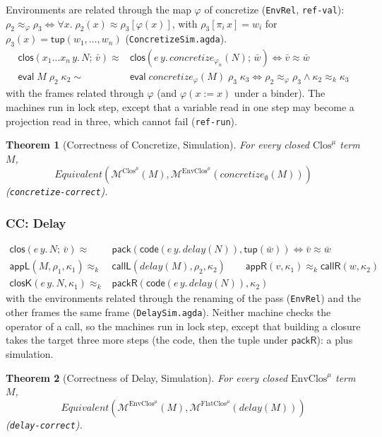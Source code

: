 \documentclass[10pt]{article}
\theoremstyle{acmplain}
\newtheorem{theorem}{Theorem}[section]
\newcommand{\key}[1]{\mathsf{#1}}
\newcommand{\pass}[1]{\mathit{#1}}
\newcommand{\prj}[1]{\pi_{#1}\,}
\newcommand{\ext}[3]{#1(#2{:=}#3)}
\newcommand{\ev}[3]{\key{eval}\;#1\;#2\;#3}
\newcommand{\Mach}[1]{\mathcal{M}^{#1}}
\newcommand{\Equiv}{\mathit{Equivalent}}
\newcommand{\closV}[2]{\key{clos}(#1;\, #2)}
\newcommand{\tupV}[1]{\key{tup}(#1)}
\newcommand{\Kf}[2]{\key{#1}(#2)}
\newcommand{\approxk}{\approx_k}
\newcommand{\Tpack}[2]{\key{pack}(#1, #2)}     %
\newcommand{\TcodeV}[1]{\key{code}(#1)}                   %
\newcommand{\Ml}[1]{\textrm{#1}^{\mu}}                  %
\begin{document}
Environments are related through the map $\varphi$ of concretize
(\texttt{EnvRel}, \texttt{ref-val}): $\rho_2 \approx_\varphi \rho_3 \iff
\forall x.\; \rho_2(x) \approx \rho_3[\varphi(x)]$, with
$\rho_3[\prj{i} x] = w_i$ for $\rho_3(x) = \tupV{w_1, \ldots, w_n}$
(\texttt{ConcretizeSim.agda}).
\begin{align*}
  \closV{x_1 \ldots x_n\, y.\, N}{\bar{v}} \approx {}&
    \closV{e\, y.\, \pass{concretize}_{\varphi_n}(N)}{\bar{w}}
    \iff \bar{v} \approx \bar{w} \\
  \ev{M}{\rho_2}{\kappa_2} \sim {}& \ev{\pass{concretize}_\varphi(M)}{\rho_3}{\kappa_3}
    \iff \rho_2 \approx_\varphi \rho_3 \land \kappa_2 \approxk \kappa_3
\end{align*}
with the frames related through $\varphi$ (and $\ext{\varphi}{x}{x}$ under a
binder). The machines run in lock step, except that a variable read in one
step may become a projection read in three, which cannot fail
(\texttt{ref-run}).
\begin{theorem}[Correctness of Concretize, Simulation]\label{thm:m-cek-concretize}
For every closed $\Ml{Clos}$ term $M$,
\[ \Equiv(\Mach{\Ml{Clos}}(M), \Mach{\Ml{EnvClos}}(\pass{concretize}_{\emptyset}(M))) \]
(\texttt{concretize-correct}).
\end{theorem}

\subsubsection{CC: Delay}

\begin{align*}
  \closV{e\, y.\, N}{\bar{v}} \approx {}&
    \Tpack{\TcodeV{e\, y.\, \pass{delay}(N)}}{\tupV{\bar{w}}} \iff \bar{v} \approx \bar{w} \\
  \Kf{appL}{M, \rho_1, \kappa_1} \approxk {}& \Kf{callL}{\pass{delay}(M), \rho_2, \kappa_2} \qquad
  \Kf{appR}{v, \kappa_1} \approxk \Kf{callR}{w, \kappa_2} \\
  \Kf{closK}{e\, y.\, N, \kappa_1} \approxk {}& \Kf{packR}{\TcodeV{e\, y.\, \pass{delay}(N)}, \kappa_2}
\end{align*}
with the environments related through the renaming of the pass
(\texttt{EnvRel}) and the other frames the same frame
(\texttt{DelaySim.agda}). Neither machine checks the operator of a call,
so the machines run in lock step, except that building a closure takes
the target three more steps (the code, then the tuple under
$\key{packR}$): a plus simulation.
\begin{theorem}[Correctness of Delay, Simulation]\label{thm:m-cek-delay}
For every closed $\Ml{EnvClos}$ term $M$,
\[ \Equiv(\Mach{\Ml{EnvClos}}(M), \Mach{\Ml{FlatClos}}(\pass{delay}(M))) \]
(\texttt{delay-correct}).
\end{theorem}
\end{document}
